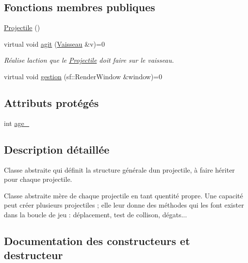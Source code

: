 \subsection*{Fonctions membres publiques}
\begin{DoxyCompactItemize}
\item 
\hyperlink{class_projectile_ac536ed2aad56af866a2078b9a85aa16d}{Projectile} ()
\item 
virtual void \hyperlink{class_projectile_a8550c8b1b012c5c290fb6da5b06f57ef}{agit} (\hyperlink{class_vaisseau}{Vaisseau} \&v)=0
\begin{DoxyCompactList}\small\item\em Réalise l\textquotesingle{}action que le {\ttfamily \hyperlink{class_projectile}{Projectile}} doit faire sur le vaisseau. \end{DoxyCompactList}\item 
virtual void \hyperlink{class_projectile_aa969857f9837d9be3a6ea415c9ba3ff1}{gestion} (sf\+::\+Render\+Window \&window)=0
\end{DoxyCompactItemize}
\subsection*{Attributs protégés}
\begin{DoxyCompactItemize}
\item 
int \hyperlink{class_projectile_a1f0a231e002d4796c32ccfeb36c887b1}{age\+\_\+}
\end{DoxyCompactItemize}


\subsection{Description détaillée}
Classe abstraite qui définit la structure générale d\textquotesingle{}un projectile, à faire hériter pour chaque projectile. 

Classe abstraite mère de chaque projectile en tant qu\textquotesingle{}entité propre. Une capacité peut créer plusieurs projectiles ; elle leur donne des méthodes qui les font exister dans la boucle de jeu \+: déplacement, test de collison, dégats... 

\subsection{Documentation des constructeurs et destructeur}
\mbox{\label{class_projectile_ac536ed2aad56af866a2078b9a85aa16d}} 
